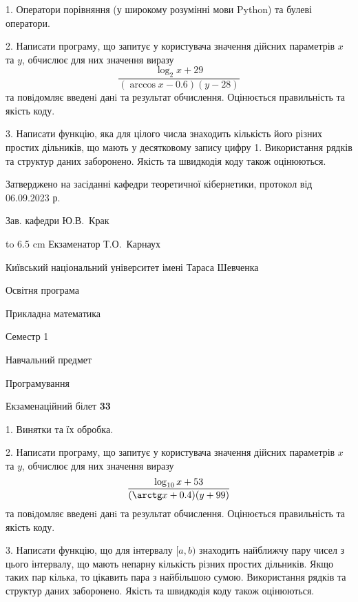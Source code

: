 \documentclass[12pt, ukrainian]{article}
\begin{document}
{%
1. Оператори порівняння (у широкому розумінні мови Python) та булеві оператори.%
\par
2. Написати програму, що запитує у користувача значення дійсних параметрів $x$ та $y$, обчислює для них значення виразу 
$$\frac{\log_{2} x + 29}{(\arccos x - 0.6) (y - 28)}$$ 
та повiдомляє введенi данi та результат обчислення.
 Оцінюється правильність та якість коду.

\par
3. Написати функцію, яка для цілого числа знаходить кількість його різних простих дільників, що мають у десятковому запису цифру 1.  Використання рядків та структур даних заборонено. Якість та швидкодія коду також оцінюються. 

}
{\smallskip\smallskip \begin {scriptsize} Затверджено на засіданні кафедри теоретичної кібернетики, протокол   від   06.09.2023 р.\par\smallskip\smallskip\smallskip\smallskip
{\parbox {6.5 cm} {Зав. кафедри \dotfill Ю.В.~Крак}}\hspace {0.7cm} {\hbox to 6.5 cm { Екзаменатор \dotfill Т.О.~Карнаух}} \end{scriptsize}}
\vspace{0.9cm}
{{\begin {scriptsize}\par
{ \center  Київський національний університет імені Тараса Шевченка \par}
{\parbox {5 cm}{Освітня програма \hfill}{\parbox {7 cm}{Прикладна математика\hfill}}\parbox {6 cm}{\hfill Семестр 1}}\par
{\parbox {5 cm} {Навчальний предмет \hfill}\parbox {7 cm}{Програмування \hfill}\parbox {6cm}{\hfill}\par}\vspace{-15pt} \end{scriptsize}}{\center Екзаменаційний білет \No \textbf { 33 }\par}}
{%
1. Винятки та їх обробка.%
\par
2. Написати програму, що запитує у користувача значення дійсних параметрів $x$ та $y$, обчислює для них значення виразу 
$$\frac{\log_{10} x + 53}{(\arctg x + 0.4) (y + 99)}$$ 
та повiдомляє введенi данi та результат обчислення.
 Оцінюється правильність та якість коду.

\par
3. Написати функцію, що для інтервалу $[a, b)$ знаходить найближчу пару чисел з цього інтервалу, що мають непарну кількість різних простих дільників. Якщо таких пар кілька, то цікавить пара з найбільшою сумою.  Використання рядків та структур даних заборонено. Якість та швидкодія коду також оцінюються. 

}
\end{document}
